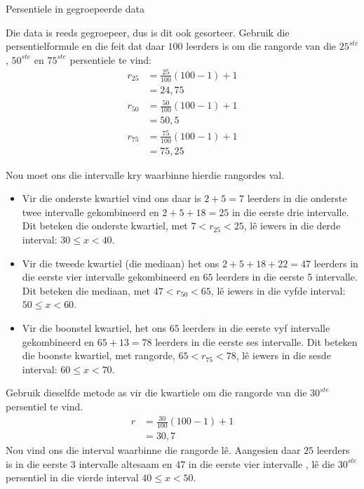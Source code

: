 \begin{wex}{Persentiele in gegroepeerde data}
{  

  Die data is reeds gegroepeer, dus is dit ook gesorteer. Gebruik die persentielformule en die feit dat daar
  $100$ leerders is om die rangorde van die $25^{ste}$, $50^{ste}$ en
  $75^{ste}$ persentiele te vind:
  \begin{align*}
    r_{25} &= \frac{25}{100}\left(100-1\right)+1 \\
          &= 24,75 \\
    r_{50} &= \frac{50}{100}\left(100-1\right)+1 \\
          &= 50,5 \\
    r_{75} &= \frac{75}{100}\left(100-1\right)+1 \\
          &= 75,25
  \end{align*}

  Nou moet ons die intervalle kry waarbinne hierdie rangordes val.

\hspace*{-40pt}
\begin{minipage}{0.85\textwidth}
\vspace*{10pt}


  \begin{itemize}
  \item Vir die onderste kwartiel vind ons daar is $2 + 5 = 7$ leerders in die onderste twee intervalle gekombineerd en $2 + 5 + 18 = 25$
    in die eerste drie intervalle. Dit beteken die onderste kwartiel, met
    $7 < r_{25} < 25$,
    lê iewers in die derde interval: $30 \leq x < 40$.
  \item Vir die tweede kwartiel (die mediaan) het ons
    $2 + 5 + 18 + 22 = 47$ leerders in die eerste vier intervalle gekombineerd en $65$ leerders in die eerste 5 intervalle. Dit beteken die mediaan, met $47 < r_{50} < 65$,
    l\^e iewers in die vyfde interval: $50 \leq x < 60$.
  \item Vir die boonstel kwartiel, het ons $65$ leerders in die eerste vyf intervalle gekombineerd en  $65 + 13 = 78$ 
    leerders in die eerste ses intervalle. Dit beteken die boonste kwartiel, met rangorde,
    $65 < r_{75} < 78$,
    l\^e iewers in die sesde interval: $60 \leq x < 70$.
  \end{itemize}
\end{minipage}

  Gebruik dieselfde metode as vir die kwartiele om die rangorde van die $30^{ste}$ persentiel te vind.
  \begin{align*}
    r &= \frac{30}{100}\left(100-1\right)+1 \\
      &= 30,7
  \end{align*}
  Nou vind ons die interval waarbinne die rangorde l\^e. Aangesien daar $25$ leerders is in die eerste $3$ intervalle altesaam en $47$
  in die eerste vier intervalle , l\^e die $30^{ste}$ persentiel in die vierde interval $40 \leq x < 50$.
}
\end{wex}


